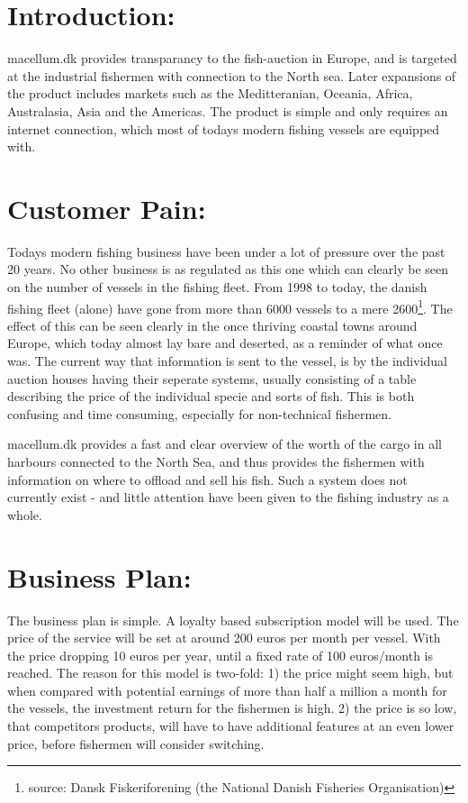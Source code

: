 \documentclass[10pt,stdletter,dateno,sigleft]{newlfm} %
\begin{document}
\begin{newlfm}


\section{Introduction:} macellum.dk provides transparancy to the fish-auction in Europe, and is targeted at the industrial fishermen with connection to the North sea. Later expansions of the product includes markets such as the Meditteranian, Oceania, Africa, Australasia, Asia and the Americas. The product is simple and only requires an internet connection, which most of todays modern fishing vessels are equipped with.\\

\section{Customer Pain:} Todays modern fishing business have been under a lot of pressure over the past 20 years. No other business is as regulated as this one which can clearly be seen on the number of vessels in the fishing fleet. From 1998 to today, the danish fishing fleet (alone) have gone from more than 6000 vessels to a mere 2600\footnote{source: Dansk Fiskeriforening (the National Danish Fisheries Organisation)}. The effect of this can be seen clearly in the once thriving coastal towns around Europe, which today almost lay bare and deserted, as a reminder of what once was. The current way that information is sent to the vessel, is by the individual auction houses having their seperate systems, usually consisting of a table describing the price of the individual specie and sorts of fish. This is both confusing and time consuming, especially for non-technical fishermen.

macellum.dk provides a fast and clear overview of the worth of the cargo in all harbours connected to the North Sea, and thus provides the fishermen with information on where to offload and sell his fish. Such a system does not currently exist - and little attention have been given to the fishing industry as a whole.\\
 
\section{Business Plan:} The business plan is simple. A loyalty based subscription model will be used. The price of the service will be set at around 200 euros per month per vessel. With the price dropping 10 euros per year, until a fixed rate of 100 euros/month is reached. The reason for this model is two-fold: 1) the price might seem high, but when compared with potential earnings of more than half a million a month for the vessels, the investment return for the fishermen is high. 2) the price is so low, that competitors products, will have to have additional features at an even lower price, before fishermen will consider switching.


\end{newlfm}
\end{document}

